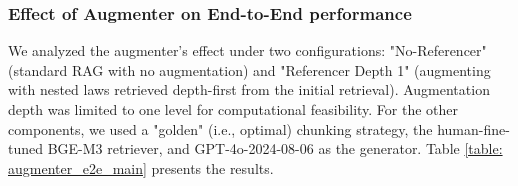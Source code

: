     
    
    
    

\subsubsection{Effect of Augmenter on End-to-End performance}
\label{subsubsec: augmenter_e2e_result}


We analyzed the augmenter's effect under two configurations: "No-Referencer" (standard RAG with no augmentation) and "Referencer Depth 1" (augmenting with nested laws retrieved depth-first from the initial retrieval). Augmentation depth was limited to one level for computational feasibility. For the other components, we used a "golden" (i.e., optimal) chunking strategy, the human-fine-tuned BGE-M3 retriever, and GPT-4o-2024-08-06 as the generator. Table \ref{table: augmenter_e2e_main} presents the results.

